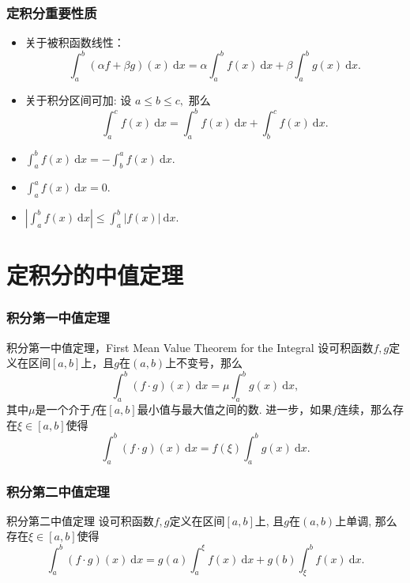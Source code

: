 \begin{frame}
\frametitle{定积分重要性质}

\begin{itemize}
\item 关于被积函数线性：
\[\int_a^b (\alpha f + \beta g)(x) ~ \mathrm{d}x = \alpha \int_a^b f(x) ~ \mathrm{d}x + \beta \int_a^b g(x) ~ \mathrm{d}x.\]
\item 关于积分区间可加: 设 $a \leqslant b \leqslant c,$ 那么
\[\int_a^c f(x) ~ \mathrm{d}x = \int_a^b f(x) ~ \mathrm{d}x + \int_b^c f(x) ~ \mathrm{d}x.\]
\item \(\displaystyle \int_a^b f(x) ~ \mathrm{d}x = -\int_b^a f(x) ~ \mathrm{d}x.\)
\item \(\displaystyle \int_a^a f(x) ~ \mathrm{d}x = 0.\)
\item \(\displaystyle \left|\int_a^b f(x) ~ \mathrm{d}x\right| \leqslant \int_a^b |f(x)| ~ \mathrm{d}x.\)
\end{itemize}

\end{frame}


\section{定积分的中值定理}


\begin{frame}
\frametitle{积分第一中值定理}

\begin{block}{积分第一中值定理，First Mean Value Theorem for the Integral}
设可积函数$f,g$定义在区间$[a,b]$上，且$g$在$(a,b)$上不变号，那么
\[\int_a^b (f\cdot g)(x) ~ \mathrm{d}x = \mu\int_a^b g(x) ~ \mathrm{d}x,\]
其中$\mu$是一个介于$f$在$[a,b]$最小值与最大值之间的数. 进一步，如果$f$连续，那么存在$\xi \in [a,b]$使得
\[\int_a^b (f\cdot g)(x) ~ \mathrm{d}x = f(\xi)\int_a^b g(x) ~ \mathrm{d}x.\]
\end{block}

\end{frame}


\begin{frame}
\frametitle{积分第二中值定理}

\begin{block}{积分第二中值定理}
设可积函数$f,g$定义在区间$[a,b]$上, 且$g$在$(a,b)$上单调, 那么存在$\xi \in [a,b]$使得
\[\int_a^b (f\cdot g)(x) ~ \mathrm{d}x = g(a)\int_a^{\xi} f(x) ~ \mathrm{d}x + g(b)\int_{\xi}^b f(x) ~ \mathrm{d}x.\]
\end{block}

\end{frame}

